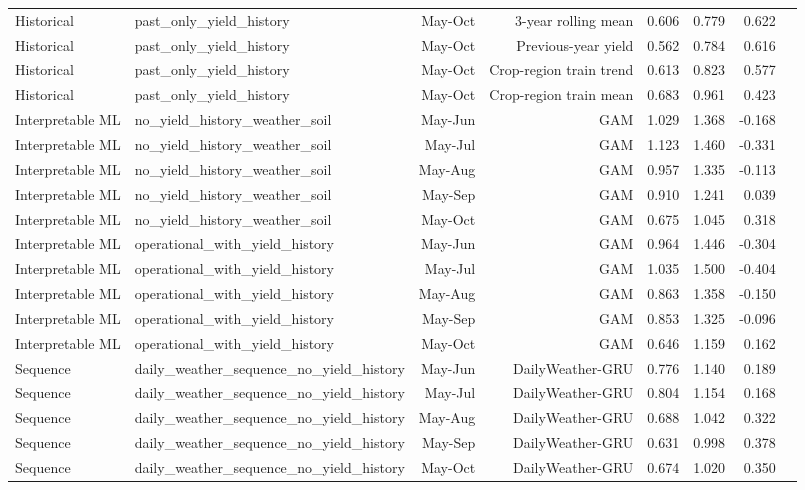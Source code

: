 \begin{tabular}{llrrrrrr}
Historical & past\_only\_yield\_history & May-Oct & 3-year rolling mean & 0.606 & 0.779 & 0.622 \\
Historical & past\_only\_yield\_history & May-Oct & Previous-year yield & 0.562 & 0.784 & 0.616 \\
Historical & past\_only\_yield\_history & May-Oct & Crop-region train trend & 0.613 & 0.823 & 0.577 \\
Historical & past\_only\_yield\_history & May-Oct & Crop-region train mean & 0.683 & 0.961 & 0.423 \\
Interpretable ML & no\_yield\_history\_weather\_soil & May-Jun & GAM & 1.029 & 1.368 & -0.168 \\
Interpretable ML & no\_yield\_history\_weather\_soil & May-Jul & GAM & 1.123 & 1.460 & -0.331 \\
Interpretable ML & no\_yield\_history\_weather\_soil & May-Aug & GAM & 0.957 & 1.335 & -0.113 \\
Interpretable ML & no\_yield\_history\_weather\_soil & May-Sep & GAM & 0.910 & 1.241 & 0.039 \\
Interpretable ML & no\_yield\_history\_weather\_soil & May-Oct & GAM & 0.675 & 1.045 & 0.318 \\
Interpretable ML & operational\_with\_yield\_history & May-Jun & GAM & 0.964 & 1.446 & -0.304 \\
Interpretable ML & operational\_with\_yield\_history & May-Jul & GAM & 1.035 & 1.500 & -0.404 \\
Interpretable ML & operational\_with\_yield\_history & May-Aug & GAM & 0.863 & 1.358 & -0.150 \\
Interpretable ML & operational\_with\_yield\_history & May-Sep & GAM & 0.853 & 1.325 & -0.096 \\
Interpretable ML & operational\_with\_yield\_history & May-Oct & GAM & 0.646 & 1.159 & 0.162 \\
Sequence & daily\_weather\_sequence\_no\_yield\_history & May-Jun & DailyWeather-GRU & 0.776 & 1.140 & 0.189 \\
Sequence & daily\_weather\_sequence\_no\_yield\_history & May-Jul & DailyWeather-GRU & 0.804 & 1.154 & 0.168 \\
Sequence & daily\_weather\_sequence\_no\_yield\_history & May-Aug & DailyWeather-GRU & 0.688 & 1.042 & 0.322 \\
Sequence & daily\_weather\_sequence\_no\_yield\_history & May-Sep & DailyWeather-GRU & 0.631 & 0.998 & 0.378 \\
Sequence & daily\_weather\_sequence\_no\_yield\_history & May-Oct & DailyWeather-GRU & 0.674 & 1.020 & 0.350 \\

\end{tabular}
